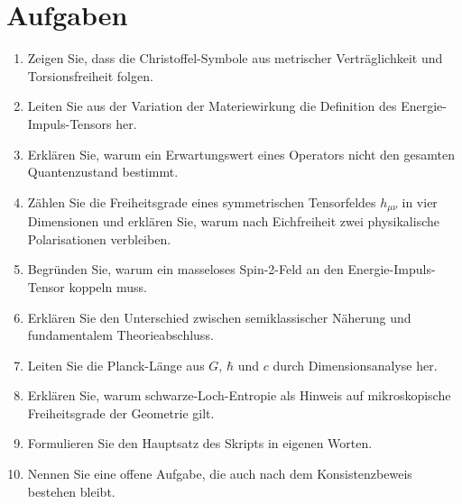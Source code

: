 \documentclass[11pt,a4paper]{book}
\theoremstyle{remark}
\begin{document}
\section*{Aufgaben}
\begin{enumerate}
\item Zeigen Sie, dass die Christoffel-Symbole aus metrischer Verträglichkeit und Torsionsfreiheit folgen.
\item Leiten Sie aus der Variation der Materiewirkung die Definition des Energie-Impuls-Tensors her.
\item Erklären Sie, warum ein Erwartungswert eines Operators nicht den gesamten Quantenzustand bestimmt.
\item Zählen Sie die Freiheitsgrade eines symmetrischen Tensorfeldes $h_{\mu\nu}$ in vier Dimensionen und erklären Sie, warum nach Eichfreiheit zwei physikalische Polarisationen verbleiben.
\item Begründen Sie, warum ein masseloses Spin-2-Feld an den Energie-Impuls-Tensor koppeln muss.
\item Erklären Sie den Unterschied zwischen semiklassischer Näherung und fundamentalem Theorieabschluss.
\item Leiten Sie die Planck-Länge aus $G$, $\hbar$ und $c$ durch Dimensionsanalyse her.
\item Erklären Sie, warum schwarze-Loch-Entropie als Hinweis auf mikroskopische Freiheitsgrade der Geometrie gilt.
\item Formulieren Sie den Hauptsatz des Skripts in eigenen Worten.
\item Nennen Sie eine offene Aufgabe, die auch nach dem Konsistenzbeweis bestehen bleibt.
\end{enumerate}
\end{document}
